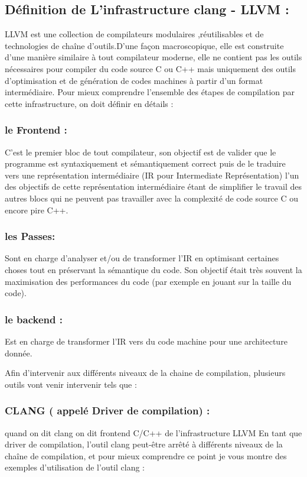 \documentclass[12pt,titlepage]{article}
\begin{document}
\subsection{ Définition de  L’infrastructure clang - LLVM :} 
LLVM est une collection de compilateurs modulaires ,réutilisables et de technologies de chaîne d'outils.D’une façon macroscopique, elle est construite d’une manière similaire à tout compilateur moderne, elle ne contient pas les outils nécessaires pour compiler du code source C ou C++ mais uniquement des outils d’optimisation et de génération de codes machines à partir d’un format intermédiaire. 
 Pour mieux comprendre l’ensemble des étapes de compilation par cette infrastructure,   on doit définir en détails :
       
     \subsubsection{  le Frontend : }
     C'est le premier bloc de tout compilateur, son objectif est de valider que le programme est syntaxiquement et sémantiquement correct puis de le traduire vers une représentation intermédiaire (IR pour Intermediate Représentation) l'un des objectifs de cette représentation intermédiaire étant de simplifier le travail des autres blocs qui ne peuvent pas travailler avec la complexité de code source C ou encore pire C++. 

     \subsubsection{ les Passes: }
     Sont en charge d’analyser et/ou de transformer l’IR en optimisant certaines choses tout en préservant la sémantique du code. Son objectif était très souvent la maximisation des performances du code (par exemple en jouant sur la taille du code).

    \subsubsection{ le backend :}
    Est en charge de transformer l’IR vers du code machine pour une architecture donnée.

Afin d’intervenir aux différents niveaux de la chaine de compilation, plusieurs outils vont venir intervenir tels que :

   \subsubsection{ CLANG ( appelé Driver de compilation) :} quand on dit clang on dit frontend C/C++ de l’infrastructure LLVM
En tant que driver de compilation, l’outil clang peut-être arrêté à différents niveaux de la chaîne de compilation, et pour mieux comprendre ce point je vous montre des exemples d’utilisation de l’outil clang :
      
\end{document}
